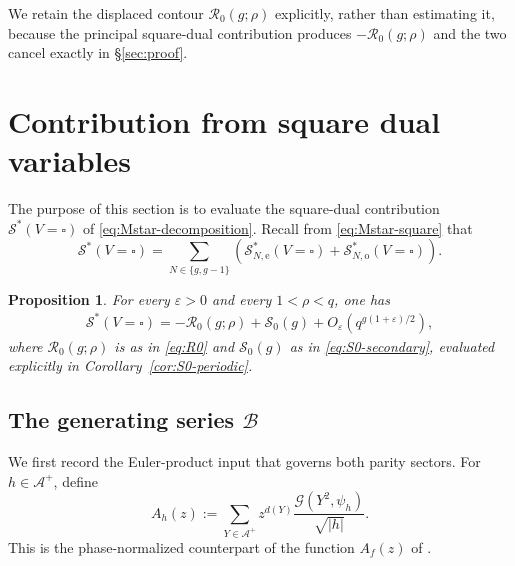 \documentclass[a4paper,reqno]{amsart}
\numberwithin{equation}{section}
\newtheorem{proposition}[theorem]{Proposition}
\theoremstyle{remark}
\theoremstyle{definition}
\newcommand{\A}{\mathcal{A}}
\newcommand{\Gc}{\mathcal{G}}
\begin{document}
We retain the displaced contour $\mathcal R_0(g;\rho)$ explicitly, rather
than estimating it, because the principal square-dual contribution produces
$-\mathcal R_0(g;\rho)$ and the two cancel exactly in \S\ref{sec:proof}.

\section{Contribution from square dual variables}\label{sec:square-dual}

The purpose of this section is to evaluate the square-dual contribution
$\mathcal S^*(V=\square)$ of \eqref{eq:Mstar-decomposition}.
Recall from \eqref{eq:Mstar-square} that
\begin{equation}\label{eq:Sstar-square-split}
\mathcal{S}^*(V=\square)
=\sum_{N\in\{g,g-1\}}\left(\mathcal{S}_{N,\mathrm e}^{*}(V=\square)+\mathcal{S}_{N,\mathrm o}^{*}(V=\square)\right).
\end{equation}

\begin{proposition}\label{prop:square-dual-main}
For every $\varepsilon>0$ and every $1<\rho<q$, one has
\begin{align}\label{eq:square-dual-main}
\mathcal{S}^*(V=\square)
=-\mathcal R_0(g;\rho)+\mathcal S_0(g)
+O_\varepsilon\!\left(q^{g(1+\varepsilon)/2}\right),
\end{align}
where $\mathcal R_0(g;\rho)$ is as in \eqref{eq:R0} and $\mathcal S_0(g)$ as in
\eqref{eq:S0-secondary}, evaluated explicitly in
Corollary~\ref{cor:S0-periodic}.
\end{proposition}



\subsection{The generating series \texorpdfstring{$\mathcal B$}{B}}

We first record the Euler-product input that governs both parity sectors.
For $h\in\A^+$, define
\begin{equation}\label{eq:Ah_def}
A_h(z):=\sum_{Y\in\A^+}z^{d(Y)}\frac{\Gc(Y^2,\psi_h)}{\sqrt{|h|}}.
\end{equation}
This is the phase-normalized counterpart of the function $A_f(z)$ of
\cite[Section~3.2]{Ju20}.
\end{document}
